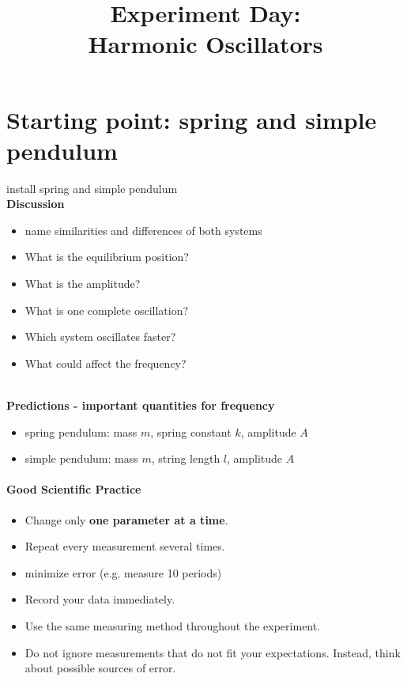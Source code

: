 \documentclass[a4paper,11pt]{article}
\title{Experiment Day:\\Harmonic Oscillators}
\author{}
\date{}
\begin{document}
\maketitle

\section{Starting point: spring and simple pendulum}

install spring and simple pendulum \\ 
\textbf{Discussion}
\begin{itemize}
    \item name similarities and differences of both systems
    \item What is the equilibrium position?
    \item What is the amplitude?
    \item What is one complete oscillation?
    \item Which system oscillates faster?
    \item What could affect the frequency?
\end{itemize} 
\\  
 \textbf{Predictions - important quantities for frequency }
\begin{itemize}
    \item spring pendulum: mass $m$, spring constant $k$, amplitude $A$
    \item simple pendulum: mass $m$, string length $l$, amplitude $A$
\end{itemize} 

\paragraph{Good Scientific Practice}

\begin{itemize}
    \item Change only \textbf{one parameter at a time}.
    \item Repeat every measurement several times.
    \item minimize error (e.g. measure 10 periods)
    \item Record your data immediately.
    \item Use the same measuring method throughout the experiment.
    \item Do not ignore measurements that do not fit your expectations. Instead, think about possible sources of error.
\end{itemize}
\end{document}
